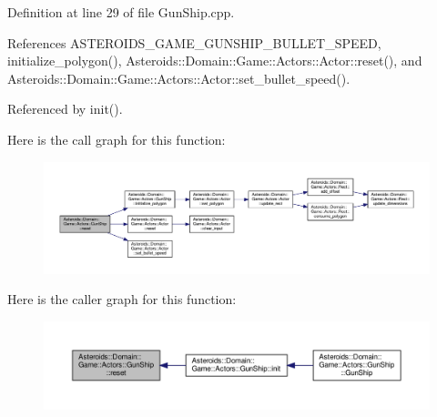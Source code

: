 Definition at line 29 of file Gun\+Ship.\+cpp.



References A\+S\+T\+E\+R\+O\+I\+D\+S\+\_\+\+G\+A\+M\+E\+\_\+\+G\+U\+N\+S\+H\+I\+P\+\_\+\+B\+U\+L\+L\+E\+T\+\_\+\+S\+P\+E\+ED, initialize\+\_\+polygon(), Asteroids\+::\+Domain\+::\+Game\+::\+Actors\+::\+Actor\+::reset(), and Asteroids\+::\+Domain\+::\+Game\+::\+Actors\+::\+Actor\+::set\+\_\+bullet\+\_\+speed().



Referenced by init().

Here is the call graph for this function\+:\nopagebreak
\begin{figure}[H]
\begin{center}
\leavevmode
\includegraphics[width=350pt]{classAsteroids_1_1Domain_1_1Game_1_1Actors_1_1GunShip_a753c275a7840962c92cfe4843bcbd6ac_cgraph}
\end{center}
\end{figure}
Here is the caller graph for this function\+:\nopagebreak
\begin{figure}[H]
\begin{center}
\leavevmode
\includegraphics[width=350pt]{classAsteroids_1_1Domain_1_1Game_1_1Actors_1_1GunShip_a753c275a7840962c92cfe4843bcbd6ac_icgraph}
\end{center}
\end{figure}
\mbox{\label{classAsteroids_1_1Domain_1_1Game_1_1Actors_1_1GunShip_a4b37d42d9758c701d75e6a91dda71a5b}} 
